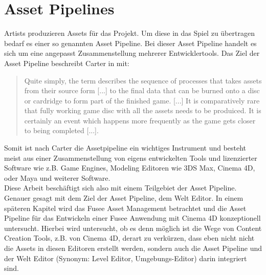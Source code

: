 \documentclass[pagesize, paper=a4, fontsize=12pt, titlepage=true, headings=small, headnosepline, abstractoff, liststotoc, nochapterprefix, plainheadsepline, twoside]{scrreprt}
\begin{document}
\section{Asset Pipelines}
Artists produzieren Assets für das Projekt. Um diese in das Spiel zu übertragen bedarf es einer so genannten Asset Pipeline. Bei dieser Asset Pipeline handelt es sich um eine angepasst Zusammenstellung mehrerer Entwicklertools. Das Ziel der Asset Pipeline beschreibt Carter in  mit:
\begin{quote}
\glqq Quite simply, the term describes the sequence of processes that takes assets from their source form [...] to the final data that can be burned onto a disc or cardridge to form part of the finished game.
[...]
It is comparatively rare that fully working game disc with all the assets needs to be produiced. It is certainly an event which happens more frequently as the game gets closer to being completed [...].\grqq{} 
\end{quote}
Somit ist nach Carter die Assetpipeline ein wichtiges Instrument und besteht meist aus einer Zusammenstellung von eigens entwickelten Tools und lizenzierter Software wie z.B. Game Engines, Modeling Editoren wie 3DS Max, Cinema 4D, oder Maya und weiterer Software.\\
Diese Arbeit beschäftigt sich also mit einem Teilgebiet der Asset Pipeline. Genauer gesagt mit dem Ziel der Asset Pipeline, dem Welt Editor. In einem späteren Kapitel wird das Fusee Asset Management betrachtet und die Asset Pipeline für das Entwickeln einer Fusee Anwendung mit Cinema 4D konzeptionell untersucht. Hierbei wird untersucht, ob es denn möglich ist die Wege von Content Creation Tools, z.B. von Cinema 4D, derart zu verkürzen, dass eben nicht nicht die Assets in diesen Editoren erstellt werden, sondern auch die Asset Pipeline und der Welt Editor (Synonym: Level Editor, Umgebungs-Editor) darin integriert sind.
\end{document}
